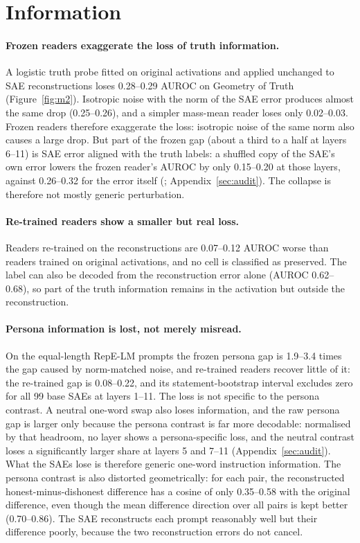 \section{Information}\label{sec:info}

\paragraph{Frozen readers exaggerate the loss of truth information.} A logistic truth probe fitted on original
activations and applied unchanged to SAE reconstructions loses 0.28--0.29 AUROC on Geometry of Truth
(Figure~\ref{fig:m2}). Isotropic noise with the norm of the SAE error produces almost the same drop (0.25--0.26), and a
simpler mass-mean reader loses only 0.02--0.03. Frozen readers therefore exaggerate the loss: isotropic noise of the
same norm also causes a large drop. But part of the frozen gap (about a third to a half at layers 6--11) is SAE error
aligned with the truth labels: a shuffled copy of the SAE's own error lowers the frozen reader's AUROC by only
0.15--0.20 at those layers, against 0.26--0.32 for the error itself (; Appendix~\ref{sec:audit}).
The collapse is therefore not mostly generic perturbation.

\paragraph{Re-trained readers show a smaller but real loss.} Readers re-trained on the reconstructions are 0.07--0.12
AUROC worse than readers trained on original activations, and no cell is classified as preserved. The label can also be
decoded from the reconstruction error alone (AUROC 0.62--0.68), so part of the truth information remains in the
activation but outside the reconstruction.

\paragraph{Persona information is lost, not merely misread.} On the equal-length RepE-LM prompts the frozen persona
gap is 1.9--3.4 times the gap caused by norm-matched noise, and re-trained readers recover little of it: the
re-trained gap is 0.08--0.22, and its statement-bootstrap interval excludes zero for all 99 base SAEs at layers 1--11.
The loss is not specific to the persona contrast. A neutral one-word swap also loses information, and the raw persona
gap is larger only because the persona contrast is far more decodable: normalised by that headroom, no layer shows a
persona-specific loss, and the neutral contrast loses a significantly larger share at layers 5 and 7--11
(Appendix~\ref{sec:audit}). What the SAEs lose is therefore generic one-word instruction information. The persona contrast is also distorted geometrically: for each pair, the
reconstructed honest-minus-dishonest difference has a cosine of only 0.35--0.58 with the original difference, even
though the mean difference direction over all pairs is kept better (0.70--0.86). The SAE reconstructs each prompt
reasonably well but their difference poorly, because the two reconstruction errors do not cancel.

